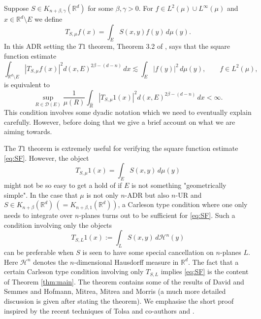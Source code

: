 \documentclass[11pt,a4paper,leqno]{amsart}
\newcommand{\R}{\mathbb{R}}
\numberwithin{equation}{section}
\theoremstyle{plain}
\theoremstyle{definition}
\theoremstyle{remark}
\begin{document}
Suppose $S \in K_{n+\beta, \gamma}(\R^d)$ for some $\beta,\gamma > 0$. 
For $f \in L^2(\mu) \cup L^{\infty}(\mu)$ and $x \in \R^{d} \setminus E$ we define
\begin{displaymath}
T_{S, \mu} f(x) = \int_E S(x,y)f(y)\,d\mu(y).
\end{displaymath}
In this ADR setting the $T1$ theorem, Theorem 3.2 of \cite{HMMM}, says that the square function estimate
\begin{equation}\label{eq:SF}
\int_{\R^{d} \setminus E} |T_{S,\mu}f(x)|^2 d(x, E)^{2\beta-(d-n)}\, dx \lesssim \int_E |f(y)|^2 \,d\mu(y), \qquad f \in L^2(\mu),
\end{equation}
is equivalent to
\begin{equation}\label{eq:t1}
\sup_{R \in \mathcal{D}(E)} \frac{1}{\mu(R)} \int_{\widehat R}  |T_{S,\mu}1(x)|^2 d(x, E)^{2\beta-(d-n)}\, dx < \infty.
\end{equation}
This condition involves some dyadic notation which we need to eventually explain carefully. However, before doing that we give a brief account on what we are aiming towards.

The $T1$ theorem is extremely useful for verifying the square function estimate \eqref{eq:SF}. However, the object
\begin{displaymath}
T_{S, \mu}1(x) = \int_E S(x,y)\,d\mu(y)
\end{displaymath} 
might not be so easy to get a hold of if $E$ is not something "geometrically simple". In the case that $\mu$ is not only $n$-ADR but also $n$-UR and $S \in K_{n+\beta}(\R^d)\, (= K_{n+\beta, 1}(\R^d))$, a Carleson type condition where one only needs to integrate over $n$-planes turns out to be sufficient for  \eqref{eq:SF}. Such a condition involving only the objects
\begin{displaymath}
T_{S, L}1(x) := \int_L S(x,y)\,d\mathcal{H}^n(y)
\end{displaymath}
can be preferable when $S$ is seen to have some special cancellation on $n$-planes $L$. Here $\mathcal{H}^n$ denotes the $n$-dimensional Hausdorff measure in $\R^d$.
The fact that a certain Carleson type condition involving only $T_{S,L}$ implies \eqref{eq:SF}
is the content of Theorem \ref{thm:main}. The theorem contains some of the results of David and Semmes \cite{DS} and Hofmann, Mitrea, Mitrea and Morris \cite{HMMM} (a much more detailed discussion is given after
stating the theorem). We emphasise the short proof inspired by the recent techniques of Tolsa and co-authors \cite{T1} and \cite{CGLT}.
\end{document}
